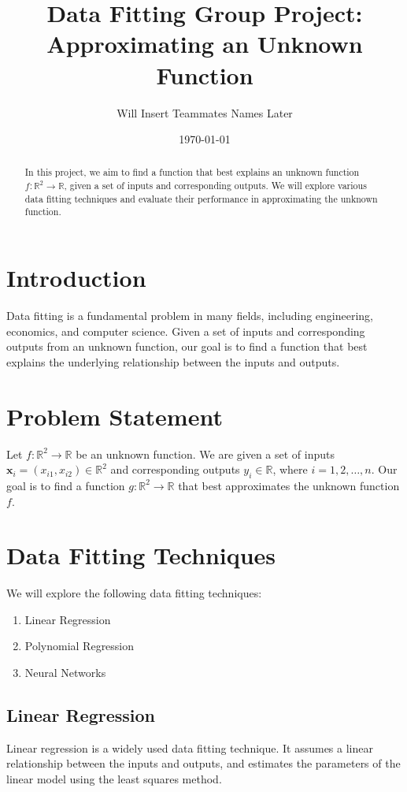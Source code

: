 \documentclass{article}
\title{Data Fitting Group Project: Approximating an Unknown Function}
\author{Will Insert Teammates Names Later}
\date{\today}
\begin{document}
\maketitle

\begin{abstract}
In this project, we aim to find a function that best explains an unknown function $f: \mathbb{R}^2 \rightarrow \mathbb{R}$, given a set of inputs and corresponding outputs. We will explore various data fitting techniques and evaluate their performance in approximating the unknown function.
\end{abstract}

\section{Introduction}
Data fitting is a fundamental problem in many fields, including engineering, economics, and computer science. Given a set of inputs and corresponding outputs from an unknown function, our goal is to find a function that best explains the underlying relationship between the inputs and outputs.

\section{Problem Statement}
Let $f: \mathbb{R}^2 \rightarrow \mathbb{R}$ be an unknown function. We are given a set of inputs $\mathbf{x}_i = (x_{i1}, x_{i2}) \in \mathbb{R}^2$ and corresponding outputs $y_i \in \mathbb{R}$, where $i = 1, 2, \ldots, n$. Our goal is to find a function $g: \mathbb{R}^2 \rightarrow \mathbb{R}$ that best approximates the unknown function $f$.

\section{Data Fitting Techniques}
We will explore the following data fitting techniques:

\begin{enumerate}
\item Linear Regression
\item Polynomial Regression
\item Neural Networks
\end{enumerate}

\subsection{Linear Regression}
Linear regression is a widely used data fitting technique. It assumes a linear relationship between the inputs and outputs, and estimates the parameters of the linear model using the least squares method.
\end{document}
